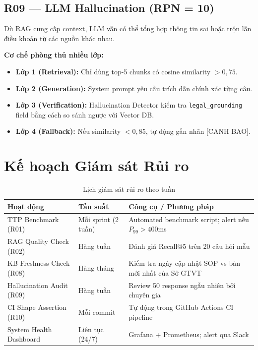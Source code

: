 \subsection{R09 --- LLM Hallucination (RPN = 10)}

Dù RAG cung cấp context, LLM vẫn có thể tổng hợp thông tin sai hoặc trộn lẫn điều khoản từ các nguồn khác nhau.

\textbf{Cơ chế phòng thủ nhiều lớp:}
\begin{itemize}[leftmargin=1.5cm, itemsep=3pt]
  \item \textbf{Lớp 1 (Retrieval):} Chỉ dùng top-5 chunks có cosine similarity $> 0{,}75$.
  \item \textbf{Lớp 2 (Generation):} System prompt yêu cầu trích dẫn chính xác từng câu.
  \item \textbf{Lớp 3 (Verification):} Hallucination Detector kiểm tra \texttt{legal\_grounding} field bằng cách so sánh ngược với Vector DB.
  \item \textbf{Lớp 4 (Fallback):} Nếu similarity $< 0{,}85$, tự động gắn nhãn [CANH BAO].
\end{itemize}

\section{Kế hoạch Giám sát Rủi ro}

\begin{table}[H]
\centering
\caption{Lịch giám sát rủi ro theo tuần}
\label{tab:risk_monitoring}
\renewcommand{\arraystretch}{1.4}
\begin{tabular}{p{3.5cm} p{3cm} p{5.5cm}}
\toprule
\textbf{Hoạt động} & \textbf{Tần suất} & \textbf{Công cụ / Phương pháp} \\
\midrule
TTP Benchmark (R01) & Mỗi sprint (2 tuần) & Automated benchmark script; alert nếu $P_{99} > 400$ms \\
\rowcolor{rowgray}
RAG Quality Check (R02) & Hàng tuần & Đánh giá Recall@5 trên 20 câu hỏi mẫu \\
KB Freshness Check (R08) & Hàng tháng & Kiểm tra ngày cập nhật SOP vs bản mới nhất của Sở GTVT \\
\rowcolor{rowgray}
Hallucination Audit (R09) & Hàng tuần & Review 50 response ngẫu nhiên bởi chuyên gia \\
CI Shape Assertion (R10) & Mỗi commit & Tự động trong GitHub Actions CI pipeline \\
\rowcolor{rowgray}
System Health Dashboard & Liên tục (24/7) & Grafana + Prometheus; alert qua Slack \\
\bottomrule
\end{tabular}
\end{table}

